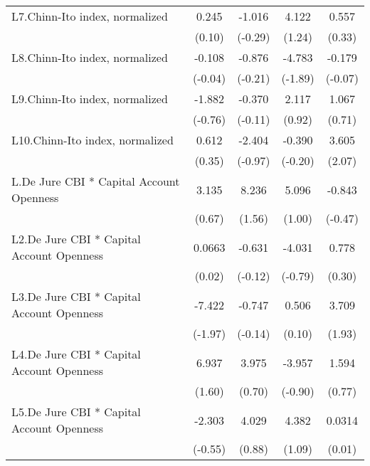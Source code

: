 {\begin{longtable}{l*{4}{c}}
L7.Chinn-Ito index, normalized&    0.245         &   -1.016         &    4.122         &    0.557         \\
                &   (0.10)         &  (-0.29)         &   (1.24)         &   (0.33)         \\
\addlinespace
L8.Chinn-Ito index, normalized&   -0.108         &   -0.876         &   -4.783         &   -0.179         \\
                &  (-0.04)         &  (-0.21)         &  (-1.89)         &  (-0.07)         \\
\addlinespace
L9.Chinn-Ito index, normalized&   -1.882         &   -0.370         &    2.117         &    1.067         \\
                &  (-0.76)         &  (-0.11)         &   (0.92)         &   (0.71)         \\
\addlinespace
L10.Chinn-Ito index, normalized&    0.612         &   -2.404         &   -0.390         &    3.605\sym{*}  \\
                &   (0.35)         &  (-0.97)         &  (-0.20)         &   (2.07)         \\
\addlinespace
L.De Jure CBI * Capital Account Openness&    3.135         &    8.236         &    5.096         &   -0.843         \\
                &   (0.67)         &   (1.56)         &   (1.00)         &  (-0.47)         \\
\addlinespace
L2.De Jure CBI * Capital Account Openness&   0.0663         &   -0.631         &   -4.031         &    0.778         \\
                &   (0.02)         &  (-0.12)         &  (-0.79)         &   (0.30)         \\
\addlinespace
L3.De Jure CBI * Capital Account Openness&   -7.422\sym{*}  &   -0.747         &    0.506         &    3.709         \\
                &  (-1.97)         &  (-0.14)         &   (0.10)         &   (1.93)         \\
\addlinespace
L4.De Jure CBI * Capital Account Openness&    6.937         &    3.975         &   -3.957         &    1.594         \\
                &   (1.60)         &   (0.70)         &  (-0.90)         &   (0.77)         \\
\addlinespace
L5.De Jure CBI * Capital Account Openness&   -2.303         &    4.029         &    4.382         &   0.0314         \\
                &  (-0.55)         &   (0.88)         &   (1.09)         &   (0.01)         \\

\end{longtable}}
